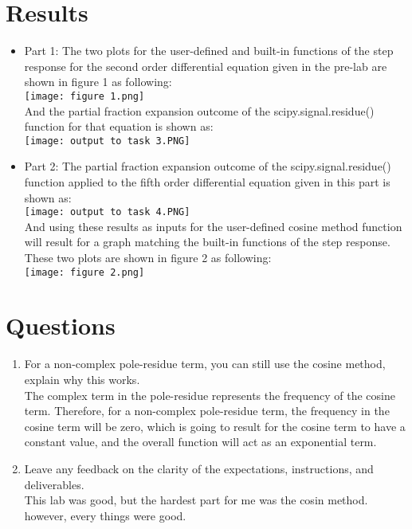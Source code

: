 \documentclass[12pt]{report}
\begin{document}
\section{Results}
\begin{itemize}
    \item Part 1:
    The two plots for the user-defined and built-in functions of the step response for the second order differential equation given in the pre-lab are shown in figure 1 as following:\\
    \texttt{[image: figure 1.png]}\\
    And the partial fraction expansion outcome of the scipy.signal.residue() function for that equation is shown as:\\
    \texttt{[image: output to task 3.PNG]}\\
    
     \item Part 2:
    The partial fraction expansion outcome of the scipy.signal.residue() function applied to the fifth order differential equation given in this part is shown as:\\
    \texttt{[image: output to task 4.PNG]}\\
    And using these results as inputs for the user-defined cosine method function will result for a graph matching the built-in functions of the step response. These two plots are shown in figure 2 as following:\\
    \texttt{[image: figure 2.png]}
    
\end{itemize}


\section{Questions}

\begin{enumerate}
    \item 
    For a non-complex pole-residue term, you can still use the cosine method, explain why this works.\\
    The complex term in the pole-residue represents the frequency of the cosine term. Therefore, for a non-complex pole-residue term, the frequency in the cosine term will be zero, which is going to result for the cosine term to have a constant value, and the overall function will act as an exponential term.
    
    \item
    Leave any feedback on the clarity of the expectations, instructions, and deliverables.\\
    This lab was good, but the hardest part for me was the cosin method. however, every things were good.
    
\end{enumerate}
\end{document}
